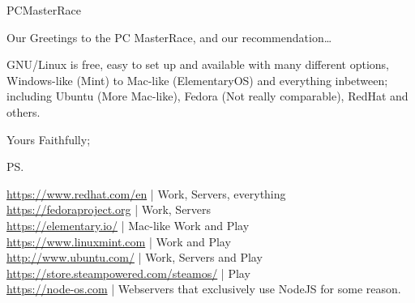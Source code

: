 \documentclass[a5paper, 13pt]{letter} %
\begin{document}
\begin{letter}{PCMasterRace}
\opening{Our Greetings to the PC MasterRace, and our recommendation\ldots}

GNU/Linux is free, easy to set up and available with many different options, Windows-like (Mint) to Mac-like (ElementaryOS) and everything inbetween; including Ubuntu (More Mac-like), Fedora (Not really comparable), RedHat and others.

\closing{Yours Faithfully;}

\ps %

\url{https://www.redhat.com/en} | Work, Servers, everything \\
\url{https://fedoraproject.org} | Work, Servers \\
\url{https://elementary.io/} | Mac-like Work and Play \\
\url{https://www.linuxmint.com} | Work and Play \\
\url{http://www.ubuntu.com/} | Work, Servers and Play \\
\url{https://store.steampowered.com/steamos/} | Play \\
\url{https://node-os.com} | Webservers that exclusively use NodeJS for some reason.

\end{letter}
\end{document}
